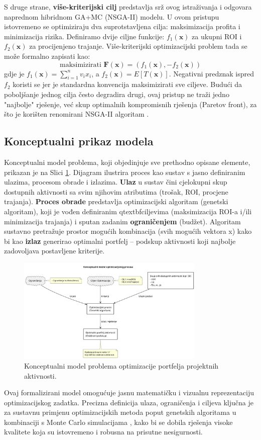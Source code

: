 S druge strane, \textbf{više-kriterijski cilj} predstavlja srž ovog istraživanja i odgovara naprednom hibridnom GA+MC (NSGA-II) modelu. U ovom pristupu istovremeno se optimiziraju dva suprotstavljena cilja: maksimizacija profita i minimizacija rizika. Definiramo dvije ciljne funkcije: $f_1(\mathbf{x})$ za ukupni ROI i $f_2(\mathbf{x})$ za procijenjeno trajanje. Više-kriterijski optimizacijski problem tada se može formalno zapisati kao:
$$ \text{maksimizirati } \mathbf{F}(\mathbf{x}) = (f_1(\mathbf{x}), -f_2(\mathbf{x})) $$
gdje je $f_1(\mathbf{x})=\sum_{i=1}^n v_i x_i$, a $f_2(\mathbf{x})=E[T(\mathbf{x})]$. Negativni predznak ispred $f_2$ koristi se jer je standardna konvencija maksimizirati sve ciljeve. Budući da poboljšanje jednog cilja često degradira drugi, ovaj pristup ne traži jedno "najbolje" rješenje, već skup optimalnih kompromisnih rješenja (Paretov front), za što je korišten renomirani NSGA-II algoritam \cite{Deb2002}.

\subsection{Konceptualni prikaz modela}

Konceptualni model problema, koji objedinjuje sve prethodno opisane elemente, prikazan je na Slici \ref{fig:konceptualni_model}. Dijagram ilustrira proces kao sustav s jasno definiranim ulazima, procesom obrade i izlazima. \textbf{Ulaz} u sustav čini cjelokupni skup dostupnih aktivnosti sa svim njihovim atributima (trošak, ROI, procjene trajanja). \textbf{Proces obrade} predstavlja optimizacijski algoritam (genetski algoritam), koji je vođen definiranim qtextbf{ciljevima} (maksimizacija ROI-a i/ili minimizacija trajanja) i sputan zadanim \textbf{ograničenjem} (budžet). Algoritam sustavno pretražuje prostor mogućih kombinacija (svih mogućih vektora x) kako bi kao \textbf{izlaz} generirao optimalni portfelj – podskup aktivnosti koji najbolje zadovoljava postavljene kriterije.
\begin{figure}[H]
    \centering
    \includegraphics[width=0.8\textwidth]{slike/model_problema.png}
    \caption{Konceptualni model problema optimizacije portfelja projektnih aktivnosti.}
    \label{fig:konceptualni_model}
\end{figure}

Ovaj formalizirani model omogućuje jasnu matematičku i vizualnu reprezentaciju optimizacijskog zadatka. Precizna definicija ulaza, ograničenja i ciljeva ključna je za sustavnu primjenu optimizacijskih metoda poput genetskih algoritama \cite{Mitchell1998} u kombinaciji s Monte Carlo simulacijama \cite{Rubinstein2016}, kako bi se dobila rješenja visoke kvalitete koja su istovremeno i robusna na prisutne nesigurnosti.
